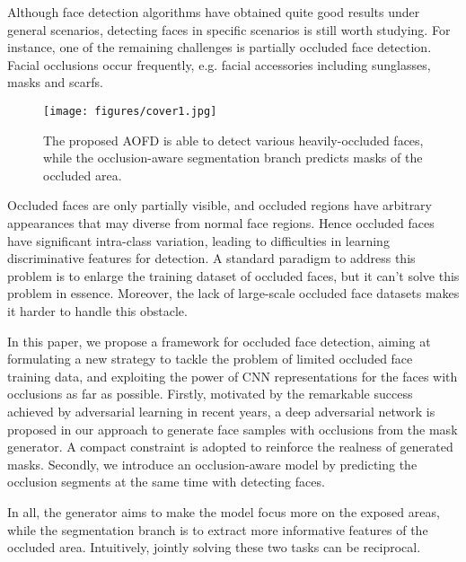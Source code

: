 \documentclass[10pt,twocolumn,letterpaper]{article}
\begin{document}
Although face detection algorithms have obtained quite good results under general scenarios, detecting faces in specific scenarios is still worth studying. 
For instance, one of the remaining challenges is partially occluded face detection. Facial occlusions occur frequently, e.g. facial accessories including sunglasses, masks and scarfs. \begin{figure}[t]
	\begin{center}
		\texttt{[image: figures/cover1.jpg]}
	\end{center}
	\vspace{-6pt}
	\caption{The proposed AOFD is able to detect various heavily-occluded faces, while the occlusion-aware segmentation branch predicts masks of the occluded area. }
	\vspace{-10pt}
	\label{fig:cover}
\end{figure}
Occluded faces are only partially visible, and occluded regions have arbitrary appearances that may diverse from normal face regions. Hence occluded faces have significant intra-class variation, leading to difficulties in learning discriminative features for detection.
A standard paradigm to address this problem is to enlarge the training dataset of occluded faces, but it can't solve this problem in essence. Moreover, the lack of large-scale occluded face datasets makes it harder to handle this obstacle.


In this paper, we propose a framework for occluded face detection, aiming at formulating a new strategy to tackle the problem of limited occluded face training data, and exploiting the power of CNN representations for the faces with occlusions as far as possible. Firstly, motivated by the remarkable success achieved by adversarial learning in recent years, a deep adversarial network is proposed in our approach to generate face samples with occlusions from the mask generator. A compact constraint is adopted to reinforce the realness of generated masks. Secondly, we introduce an occlusion-aware model by predicting the occlusion segments at the same time with detecting faces. 

In all, the generator aims to make the model focus more on the exposed areas, while the segmentation branch is to extract more informative features of the occluded area.
Intuitively, jointly solving these two tasks can be reciprocal.
\end{document}
